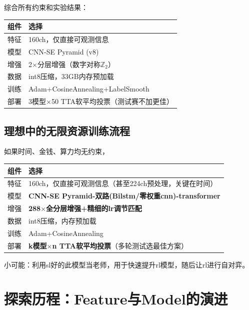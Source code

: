 \documentclass{article}
\begin{document}
综合所有约束和实验结果：

\begin{center}
\footnotesize
\begin{tabular}{lp{5.5cm}}
\toprule
组件 & 选择 \\
\midrule
特征 & 160ch，仅直接可观测信息 \\
模型 & CNN-SE Pyramid (v8) \\
增强 & 2$\times$分层增强（数字对称$\mathbb{Z}_2$） \\
数据 & int8压缩，33GB内存预加载 \\
训练 & Adam+CosineAnnealing+LabelSmooth \\
部署 & 3模型$\times$50 TTA软平均投票（测试赛不加更佳） \\
\bottomrule
\end{tabular}
\end{center}

\subsection{理想中的无限资源训练流程}
\label{sec:ideal}

如果时间、金钱、算力均无约束，

\begin{center}
\footnotesize
\begin{tabular}{lp{5.2cm}}
\toprule
组件 & 选择 \\
\midrule
特征 & 160ch，仅直接可观测信息（甚至224ch预处理，关键在时间） \\
模型 & \textbf{CNN-SE Pyramid-双路(Bilstm/零权重cnn)-transformer} \\
增强 & \textbf{288$\times$全分层增强+精细的lr调节匹配} \\
数据 & int8压缩，内存预加载 \\
训练 & Adam+CosineAnnealing \\
部署 & \textbf{k模型$\times$n TTA软平均投票}（多轮测试选最佳方案） \\
\bottomrule
\end{tabular}
\end{center}

小可能：利用sl好的此模型当老师，用于快速提升rl模型，随后让rl进行自对弈。

\section{探索历程：Feature与Model的演进}
\label{sec:evolution}
\end{document}
